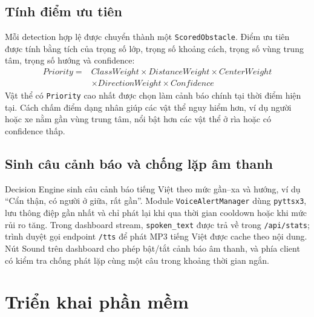\documentclass[oneside,final]{hcmut-report}
\begin{document}
\subsection{Tính điểm ưu tiên}
Mỗi detection hợp lệ được chuyển thành một \texttt{ScoredObstacle}. Điểm ưu tiên được tính bằng tích của trọng số lớp, trọng số khoảng cách, trọng số vùng trung tâm, trọng số hướng và confidence:
\[
\begin{aligned}
Priority ={}& ClassWeight \times DistanceWeight \times CenterWeight \\
            & \times DirectionWeight \times Confidence
\end{aligned}
\]
Vật thể có \texttt{Priority} cao nhất được chọn làm cảnh báo chính tại thời điểm hiện tại. Cách chấm điểm dạng nhân giúp các vật thể nguy hiểm hơn, ví dụ người hoặc xe nằm gần vùng trung tâm, nổi bật hơn các vật thể ở rìa hoặc có confidence thấp.

\subsection{Sinh câu cảnh báo và chống lặp âm thanh}
Decision Engine sinh câu cảnh báo tiếng Việt theo mức gần--xa và hướng, ví dụ ``Cẩn thận, có người ở giữa, rất gần''. Module \texttt{VoiceAlertManager} dùng \texttt{pyttsx3}, lưu thông điệp gần nhất và chỉ phát lại khi qua thời gian cooldown hoặc khi mức rủi ro tăng. Trong dashboard stream, \texttt{spoken\_text} được trả về trong \texttt{/api/stats}; trình duyệt gọi endpoint \texttt{/tts} để phát MP3 tiếng Việt được cache theo nội dung. Nút Sound trên dashboard cho phép bật/tắt cảnh báo âm thanh, và phía client có kiểm tra chống phát lặp cùng một câu trong khoảng thời gian ngắn.

\section{Triển khai phần mềm}
\end{document}
